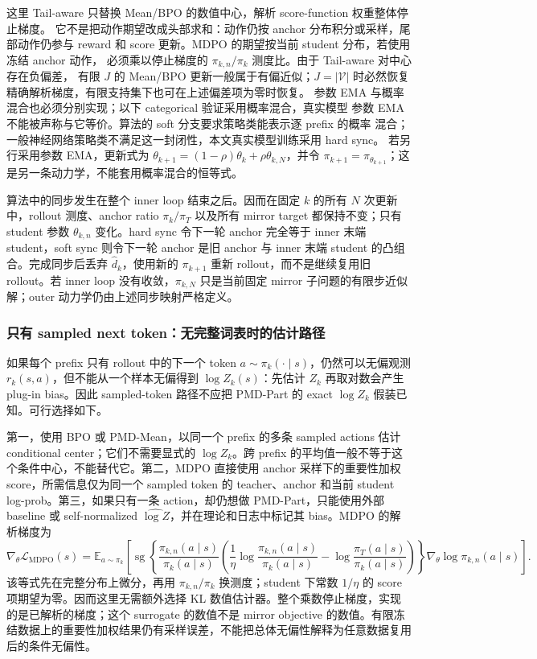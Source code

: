 这里 Tail-aware 只替换 Mean/BPO 的数值中心，解析 score-function 权重整体停止梯度。
它不是把动作期望改成头部求和：动作仍按 anchor 分布积分或采样，尾部动作仍参与
reward 和 score 更新。MDPO 的期望按当前 student 分布，若使用冻结 anchor 动作，
必须乘以停止梯度的 $\pi_{k,n}/\pi_k$ 测度比。由于 Tail-aware 对中心存在负偏差，
有限 $J$ 的 Mean/BPO 更新一般属于有偏近似；$J=|\mathcal V|$ 时必然恢复精确解析梯度，有限支持集下也可在上述偏差项为零时恢复。
参数 EMA 与概率混合也必须分别实现；以下 categorical 验证采用概率混合，真实模型
参数 EMA 不能被声称与它等价。算法的 soft 分支要求策略类能表示逐 prefix 的概率
混合；一般神经网络策略类不满足这一封闭性，本文真实模型训练采用 hard sync。
若另行采用参数 EMA，更新式为
$\theta_{k+1}=(1-\rho)\theta_k+\rho\theta_{k,N}$，并令
$\pi_{k+1}=\pi_{\theta_{k+1}}$；这是另一条动力学，不能套用概率混合的恒等式。

算法中的同步发生在整个 inner loop 结束之后。因而在固定 $k$ 的所有
$N$ 次更新中，rollout 测度、anchor ratio $\pi_k/\pi_T$ 以及所有 mirror
target 都保持不变；只有 student 参数 $\theta_{k,n}$ 变化。hard sync
令下一轮 anchor 完全等于 inner 末端 student，soft sync 则令下一轮
anchor 是旧 anchor 与 inner 末端 student 的凸组合。完成同步后丢弃
$\widehat d_k$，使用新的 $\pi_{k+1}$ 重新 rollout，而不是继续复用旧
rollout。若 inner loop 没有收敛，$\pi_{k,N}$ 只是当前固定
mirror 子问题的有限步近似解；outer 动力学仍由上述同步映射严格定义。

\subsubsection*{只有 sampled next token：无完整词表时的估计路径}

如果每个 prefix 只有 rollout 中的下一个 token $a\sim\pi_k(\cdot\mid s)$，仍然可以无偏观测 $r_k(s,a)$，但不能从一个样本无偏得到 $\log Z_k(s)$：先估计 $Z_k$ 再取对数会产生 plug-in bias。因此 sampled-token 路径不应把 PMD-Part 的 exact $\log Z_k$ 假装已知。可行选择如下。

第一，使用 BPO 或 PMD-Mean，以同一个 prefix 的多条 sampled actions 估计 conditional center；它们不需要显式的 $\log Z_k$。跨 prefix 的平均值一般不等于这个条件中心，不能替代它。第二，MDPO 直接使用 anchor 采样下的重要性加权 score，所需信息仅为同一个 sampled token 的 teacher、anchor 和当前 student log-prob。第三，如果只有一条 action，却仍想做 PMD-Part，只能使用外部 baseline 或 self-normalized $\widehat{\log Z}$，并在理论和日志中标记其 bias。MDPO 的解析梯度为
\[
\nabla_\theta\mathcal L_{\mathrm{MDPO}}(s)
=\mathbb E_{a\sim\pi_k}\!\left[
\operatorname{sg}\!\left\{
\frac{\pi_{k,n}(a\mid s)}{\pi_k(a\mid s)}
\left(\frac{1}{\eta}\log\frac{\pi_{k,n}(a\mid s)}{\pi_k(a\mid s)}
-\log\frac{\pi_T(a\mid s)}{\pi_k(a\mid s)}\right)
\right\}\nabla_\theta\log\pi_{k,n}(a\mid s)\right].
\]
该等式先在完整分布上微分，再用 $\pi_{k,n}/\pi_k$ 换测度；student 下常数 $1/\eta$ 的 score 项期望为零。因而这里无需额外选择 KL 数值估计器。整个乘数停止梯度，实现的是已解析的梯度；这个 surrogate 的数值不是 mirror objective 的数值。有限冻结数据上的重要性加权结果仍有采样误差，不能把总体无偏性解释为任意数据复用后的条件无偏性。

